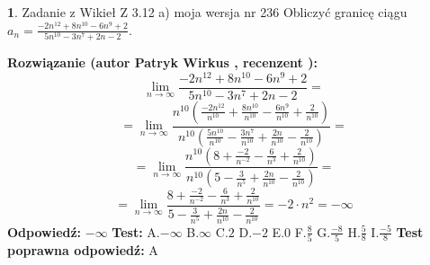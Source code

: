 \documentclass[12pt, a4paper]{article}
\theoremstyle{definition} %
\newtheorem{zad}{}
\newcommand{\zadStart}[1]{\begin{zad}#1\newline}
\newcommand{\zadStop}{\end{zad}}
\newcommand{\rozwStart}[2]{\noindent \textbf{Rozwiązanie (autor #1 , recenzent #2): }\newline}
\newcommand{\rozwStop}{\newline}
\newcommand{\odpStart}{\noindent \textbf{Odpowiedź:}\newline}
\newcommand{\odpStop}{\newline}
\newcommand{\testStart}{\noindent \textbf{Test:}\newline}
\newcommand{\testStop}{\newline}
\newcommand{\kluczStart}{\noindent \textbf{Test poprawna odpowiedź:}\newline}
\newcommand{\kluczStop}{\newline}
\begin{document}
\zadStart{Zadanie z Wikieł Z 3.12 a) moja wersja nr 236}
Obliczyć granicę ciągu $a_{n}=\frac{-2n^{12}+8n^{10}-6n^{9}+2}{5n^{10}-3n^{7}+2n-2}$.
\zadStop
\rozwStart{Patryk Wirkus}{}
$$\lim\limits_{n\to\infty}\frac{-2n^{12}+8n^{10}-6n^{9}+2}{5n^{10}-3n^{7}+2n-2}=$$
$$=\lim\limits_{n\to\infty}\frac{n^{10}\left(\frac{-2n^{12}}{n^{10}}+\frac{8n^{10}}{n^{10}}-\frac{6n^{9}}{n^{10}}+\frac{2}{n^{10}}\right)}{n^{10}\left(\frac{5n^{10}}{n^{10}}-\frac{3n^{7}}{n^{10}}+\frac{2n}{n^{10}}-\frac{2}{n^{10}}\right)}=$$
$$=\lim\limits_{n\to\infty}\frac{n^{10}\left(8+\frac{-2}{n^{-2}}-\frac{6}{n^{3}}+\frac{2}{n^{10}}\right)}
{n^{10}\left(5-\frac{3}{n^{5}}+\frac{2n}{n^{10}}-\frac{2}{n^{10}}\right)}=$$
$$=\lim\limits_{n\to\infty}\frac{8+\frac{-2}{n^{-2}}-\frac{6}{n^{3}}+\frac{2}{n^{10}}}{5-\frac{3}{n^{5}}+\frac{2n}{n^{10}}-\frac{2}{n^{10}}}=-2\cdot n^{2} = -\infty$$
\rozwStop
\odpStart
$-\infty$
\odpStop
\testStart
A.$-\infty$
B.$\infty$
C.$2$
D.$-2$
E.$0$
F.$\frac{8}{5}$
G.$\frac{-8}{5}$
H.$\frac{5}{8}$
I.$\frac{-5}{8}$
\testStop
\kluczStart
A
\kluczStop
\end{document}
